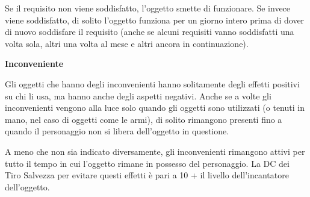 \documentclass[a4paper,11pt,twoside,openany]{book}
\begin{document}
{Se il requisito non viene soddisfatto, l'oggetto smette di funzionare. Se invece viene soddisfatto, di solito l'oggetto funziona per un giorno intero prima di dover di nuovo soddisfare il requisito (anche se alcuni requisiti vanno soddisfatti una volta sola, altri
una volta al mese e altri ancora in continuazione).

\textbf{Inconveniente}

Gli oggetti che hanno degli inconvenienti hanno solitamente degli effetti positivi su chi li usa, ma hanno anche degli aspetti negativi. Anche se a volte gli inconvenienti vengono alla luce solo quando gli oggetti sono utilizzati (o tenuti in mano, nel caso di oggetti come le armi), di solito rimangono presenti fino a quando il personaggio non si libera dell'oggetto in questione.

A meno che non sia indicato diversamente, gli inconvenienti rimangono attivi per tutto il tempo in cui l'oggetto rimane in possesso del personaggio. La DC dei Tiro Salvezza per evitare questi effetti è pari a 10 + il livello dell'incantatore dell'oggetto.

\bigskip

}
\end{document}
